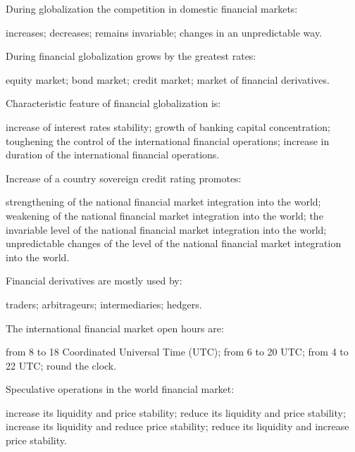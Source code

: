 \documentclass[12pt, table]{exam}
\begin{document}
\begin{questions}
\begin{multicols}{2}
\setlength{\columnsep}{1cm}

\question During globalization the competition in domestic financial markets:
	 \begin{choices}
	 \CC increases;
	 \choice decreases;
	 \choice remains invariable;
	 \choice changes in an unpredictable way.
	 \end{choices}
\question During financial globalization grows by the greatest rates:
	 \begin{choices}
	 \choice equity market;
	 \CC bond market;
	 \choice credit market;
	 \choice market of financial derivatives.
	 \end{choices}
\question Characteristic feature of financial globalization is:
	 \begin{choices}
	 \choice increase of interest rates stability;
	 \choice growth of banking capital concentration;
	 \choice toughening the control of the international financial operations;
	 \CC increase in duration of the international financial operations.
	 \end{choices}
\question Increase of a country sovereign credit rating promotes:
	 \begin{choices}
	 \choice strengthening of the national financial market integration into the world;
	 \choice weakening of the national financial market integration into the world;
	 \choice the invariable level of the national financial market integration into the world;
	 \CC unpredictable changes of the level of the national financial market integration into the world.
	 \end{choices}
\question Financial derivatives are mostly used by:
	 \begin{choices}
	 \CC traders;
	 \choice arbitrageurs;
	 \choice intermediaries;
	 \choice hedgers.
	 \end{choices}
\question The international financial market open hours are:
	 \begin{choices}
	 \choice from 8 to 18 Coordinated Universal Time (UTC);
	 \choice from 6 to 20 UTC;
	 \CC from 4 to 22 UTC;
	 \choice round the clock.
	 \end{choices}
\question Speculative operations in the world financial market:
	 \begin{choices}
	 \CC increase its liquidity and price stability;
	 \choice reduce its liquidity and price stability;
	 \choice increase its liquidity and reduce price stability;
	 \choice reduce its liquidity and increase price stability.

\end{choices}
\end{multicols}
\end{questions}
\end{document}
